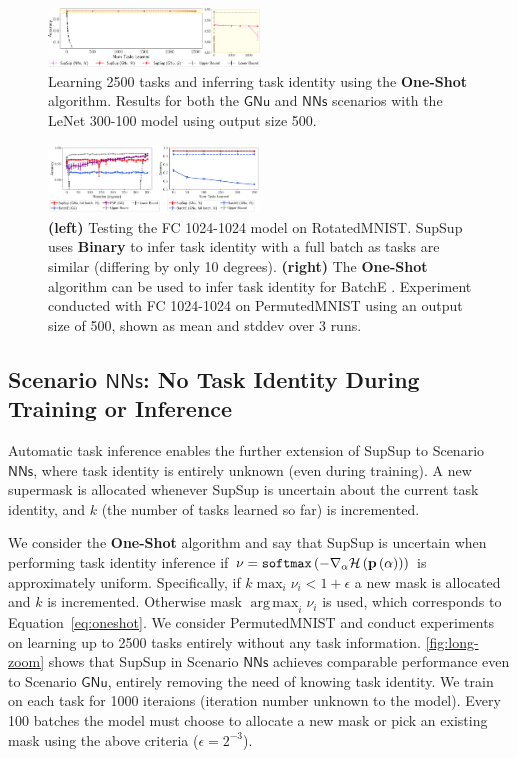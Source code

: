 \documentclass{article}
\DeclareMathOperator*{\argmax}{arg\,max}
\newcommand{\ac}{SupSup\xspace}
\newcommand{\casename}[1]{\ensuremath{\mathsf{#1}}\xspace}
\begin{document}
\begin{figure}[t]
    \centering
    \includegraphics[width=0.5\textwidth]{long_zoom.pdf}
    \caption{Learning 2500 tasks and inferring task identity using the \textbf{One-Shot} algorithm. Results for both the \casename{GNu} and \casename{NNs} scenarios with the LeNet 300-100 model using output size 500.}
    \label{fig:long-zoom}
\end{figure}

\begin{figure}[t]
    \centering
    \vspace{-1.4em}
    \includegraphics[width=0.5\textwidth]{rotate_adapt.pdf}
    \caption{\textbf{(left)} Testing the FC 1024-1024 model on RotatedMNIST. \ac uses \textbf{Binary} to infer task identity with a full batch as tasks are similar (differing by only 10 degrees). \textbf{(right)} The \textbf{One-Shot} algorithm can be used to infer task identity for BatchE \cite{wen2020batchensemble}. Experiment conducted with FC 1024-1024 on PermutedMNIST using an output size of 500, shown as mean and stddev over 3 runs.}
    \label{fig:rot-adapt}
    \vspace{-1.5em}
\end{figure}

\subsection{Scenario \casename{NNs}: No Task Identity During Training or Inference} \label{sec:S4}
Automatic task inference enables the further extension of \ac to Scenario \casename{NNs}, where task identity is entirely unknown (even during training). 
A new supermask is allocated whenever \ac is uncertain about the current task identity, and $k$ (the number of tasks learned so far) is incremented.

We consider the \textbf{One-Shot} algorithm and say that \ac is uncertain when performing task identity inference if $\nu = \texttt{softmax}\left( -\nabla_\alpha \mathcal{H} \left( \mathbf{p}\left( \alpha \right) \right) \right)$ is approximately uniform. Specifically, if $k \max_i \nu_i < 1 + \epsilon $ a new mask is allocated and $k$ is incremented. Otherwise mask $\argmax_i \nu_i$ is used, which corresponds to Equation~\ref{eq:oneshot}. We consider PermutedMNIST and conduct experiments on learning up to 2500 tasks entirely without any task information. \autoref{fig:long-zoom} shows that \ac in Scenario \casename{NNs} achieves comparable performance even to Scenario \casename{GNu}, entirely removing the need of knowing task identity.
We train on each task for 1000 iteraions (iteration number unknown to the model). Every 100 batches the model must choose to allocate a new mask or pick an existing mask using the above criteria ($\epsilon = 2^{-3}$). 
\vspace*{-1ex}
\end{document}
